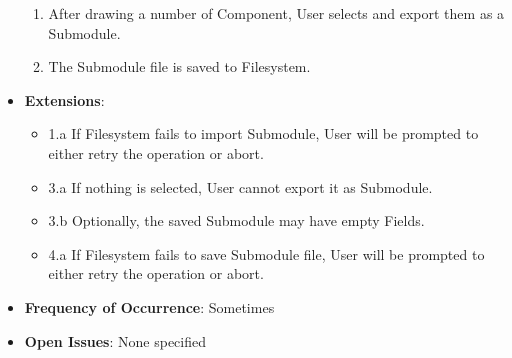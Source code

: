 \documentclass[12pt]{article}
\begin{document}
\begin{itemize}
\begin{enumerate}
		\item After drawing a number of Component, User selects and export them as a Submodule.
		\item The Submodule file is saved to Filesystem.							  
    \end{enumerate}
    \item \textbf{Extensions}:
    \begin{itemize}
        \item 1.a If Filesystem fails to import Submodule, User will be prompted to either retry the operation or abort.
        \item 3.a If nothing is selected, User cannot export it as Submodule.
        \item 3.b Optionally, the saved Submodule may have empty Fields.
        \item 4.a If Filesystem fails to save Submodule file, User will be prompted to either retry the operation or abort.
    \end{itemize}
    \item \textbf{Frequency of Occurrence}: Sometimes
    \item \textbf{Open Issues}: None specified
\end{itemize}
\end{document}
